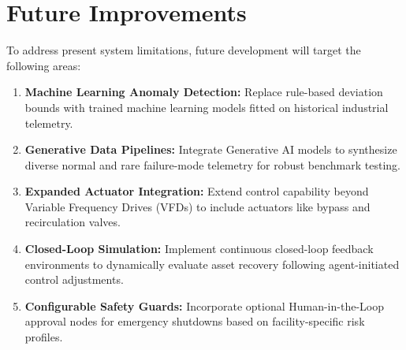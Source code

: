 \documentclass[stu, 12pt, floatsintext]{apa7}
\begin{document}
\section{Future Improvements}
To address present system limitations, future development will target the following areas:
\begin{enumerate}
	\item \textbf{Machine Learning Anomaly Detection:} Replace rule-based deviation bounds with trained machine learning models fitted on historical industrial telemetry.
	\item \textbf{Generative Data Pipelines:} Integrate Generative AI models to synthesize diverse normal and rare failure-mode telemetry for robust benchmark testing.
	\item \textbf{Expanded Actuator Integration:} Extend control capability beyond Variable Frequency Drives (VFDs) to include actuators like bypass and recirculation valves.
	\item \textbf{Closed-Loop Simulation:} Implement continuous closed-loop feedback environments to dynamically evaluate asset recovery following agent-initiated control adjustments.
	\item \textbf{Configurable Safety Guards:} Incorporate optional Human-in-the-Loop approval nodes for emergency shutdowns based on facility-specific risk profiles.
\end{enumerate}%
\printbibliography %

\appendix
{}
{}
\end{document}
